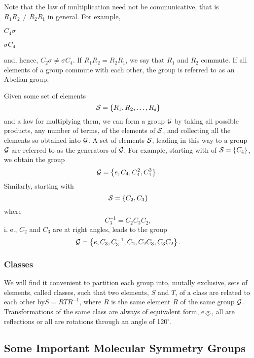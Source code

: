 Note that the law of multiplication need not be communicative, that is
$R_1 R_2 \not= R_2 R_1$ in general.  For example,

$C_4 \sigma$

$\sigma C_4$

\noindent
and, hence, $C_2 \sigma \not= \sigma C_4$.  If $R_1R_2 = R_2 R_1$, 
we say that $R_1$ and $R_2$ commute.  If all elements of a 
group commute with each other, the group is referred to as an Abelian group.

Given some set of elements
\begin{equation}
{\cal S} = \left\{ R_1 , R_2 , \dots , R_s \right\}
\end{equation}
and a law for multiplying them, we can form a group ${\cal G}$ by 
taking all possible products,
any number of terms, of the elements of	${\cal S}$, and 
collecting all the elements
so obtained into ${\cal G}$.  A set of elements	${\cal S}$, 
leading in this way to a group ${\cal G}$
are referred to as the generators of ${\cal G}$.  For example, starting
with of	${\cal S} = \{ C_4 \}$,	we obtain the group
\begin{equation}
{\cal G} = \left\{ e , C_4 , C^2_4 , C^3_4 \right\}.
\end{equation}
Similarly, starting with
\begin{equation}
{\cal S} = \left\{ C_2 , C_3 \right\}
\end{equation}
where
\begin{equation}
C^{-1}_3 = C_2 C_3 C_2 ,
\end{equation}
i. e., $C_2$ and $C_3$ are at right angles, leads to the group
\begin{equation}
{\cal G} = \left\{ e , C_3 , C^{-1}_3 , C_2 , C_2 C_3 , C_3 C_2 
\right\}.
\end{equation}

\subsubsection{Classes}

We will find it convenient to partition each group into, mutally
exclusive, sets of elements, called classes, such that two elements, 
$S$ and $T$, of a class are related to each other by$S = RTR^{-1}$,
where $R$ is the same element $R$ of the same group ${\cal G}$. 
Transformations of the same class are always of equivalent form, e.g., all are 
reflections or all are rotations through an angle of 120$^{\circ}$.

\subsection{Some Important Molecular Symmetry Groups}

